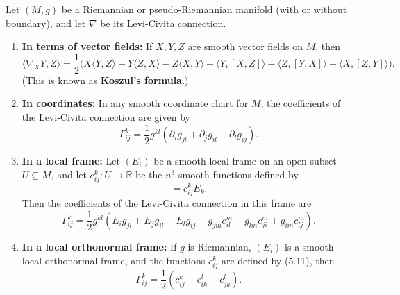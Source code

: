 \begin{corollary}
\label{cor:formulas-levi-civita-connection}

Let $(M, g)$ be a Riemannian or pseudo-Riemannian manifold (with or without boundary), and let $\nabla$ be its Levi-Civita connection.

\begin{enumerate}
\item[(a)] \textbf{In terms of vector fields:} If $X, Y, Z$ are smooth vector fields on $M$, then
\begin{equation}
\langle \nabla_X Y, Z \rangle = \frac{1}{2}\bigl(X\langle Y,Z\rangle + Y\langle Z,X\rangle - Z\langle X,Y\rangle
- \langle Y,[X,Z]\rangle - \langle Z,[Y,X]\rangle + \langle X,[Z,Y]\rangle\bigr). \tag{5.9}
\end{equation}
(This is known as \textbf{Koszul's formula}.)

\item[(b)] \textbf{In coordinates:} In any smooth coordinate chart for $M$, the coefficients of the Levi-Civita connection are given by
\begin{equation}
\Gamma^k_{ij} = \frac{1}{2} g^{kl}(\partial_i g_{jl} + \partial_j g_{il} - \partial_l g_{ij}). \tag{5.10}
\end{equation}

\item[(c)] \textbf{In a local frame:} Let $(E_i)$ be a smooth local frame on an open subset $U \subseteq M$, and let $c^k_{ij} : U \to \mathbb{R}$ be the $n^3$ smooth functions defined by
\begin{equation}
[E_i, E_j] = c^k_{ij} E_k. \tag{5.11}
\end{equation}
Then the coefficients of the Levi-Civita connection in this frame are
\begin{equation}
\Gamma^k_{ij} = \frac{1}{2} g^{kl}\left(E_i g_{jl} + E_j g_{il} - E_l g_{ij} - g_{jm}c^m_{il} - g_{lm}c^m_{ji} + g_{im}c^m_{lj}\right). \tag{5.12}
\end{equation}

\item[(d)] \textbf{In a local orthonormal frame:} If $g$ is Riemannian, $(E_i)$ is a smooth local orthonormal frame, and the functions $c^k_{ij}$ are defined by (5.11), then
\begin{equation}
\Gamma^k_{ij} = \frac{1}{2}(c^k_{ij} - c^l_{ik} - c^l_{jk}). \tag{5.13}
\end{equation}
\end{enumerate}


\end{corollary}
